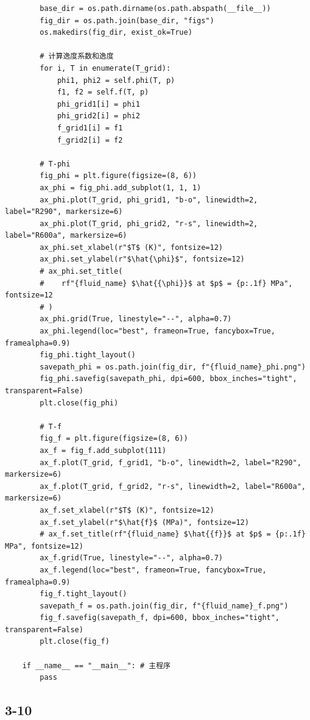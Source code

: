 \documentclass[12pt,a4paper]{article}
\begin{document}
\begin{lstlisting}
        base_dir = os.path.dirname(os.path.abspath(__file__))
        fig_dir = os.path.join(base_dir, "figs")
        os.makedirs(fig_dir, exist_ok=True)

        # 计算逸度系数和逸度
        for i, T in enumerate(T_grid):
            phi1, phi2 = self.phi(T, p)
            f1, f2 = self.f(T, p)
            phi_grid1[i] = phi1
            phi_grid2[i] = phi2
            f_grid1[i] = f1
            f_grid2[i] = f2

        # T-phi
        fig_phi = plt.figure(figsize=(8, 6))
        ax_phi = fig_phi.add_subplot(1, 1, 1)
        ax_phi.plot(T_grid, phi_grid1, "b-o", linewidth=2, label="R290", markersize=6)
        ax_phi.plot(T_grid, phi_grid2, "r-s", linewidth=2, label="R600a", markersize=6)
        ax_phi.set_xlabel(r"$T$ (K)", fontsize=12)
        ax_phi.set_ylabel(r"$\hat{\phi}$", fontsize=12)
        # ax_phi.set_title(
        #    rf"{fluid_name} $\hat{{\phi}}$ at $p$ = {p:.1f} MPa", fontsize=12
        # )
        ax_phi.grid(True, linestyle="--", alpha=0.7)
        ax_phi.legend(loc="best", frameon=True, fancybox=True, framealpha=0.9)
        fig_phi.tight_layout()
        savepath_phi = os.path.join(fig_dir, f"{fluid_name}_phi.png")
        fig_phi.savefig(savepath_phi, dpi=600, bbox_inches="tight", transparent=False)
        plt.close(fig_phi)

        # T-f
        fig_f = plt.figure(figsize=(8, 6))
        ax_f = fig_f.add_subplot(111)
        ax_f.plot(T_grid, f_grid1, "b-o", linewidth=2, label="R290", markersize=6)
        ax_f.plot(T_grid, f_grid2, "r-s", linewidth=2, label="R600a", markersize=6)
        ax_f.set_xlabel(r"$T$ (K)", fontsize=12)
        ax_f.set_ylabel(r"$\hat{f}$ (MPa)", fontsize=12)
        # ax_f.set_title(rf"{fluid_name} $\hat{{f}}$ at $p$ = {p:.1f} MPa", fontsize=12)
        ax_f.grid(True, linestyle="--", alpha=0.7)
        ax_f.legend(loc="best", frameon=True, fancybox=True, framealpha=0.9)
        fig_f.tight_layout()
        savepath_f = os.path.join(fig_dir, f"{fluid_name}_f.png")
        fig_f.savefig(savepath_f, dpi=600, bbox_inches="tight", transparent=False)
        plt.close(fig_f)
    
    if __name__ == "__main__": # 主程序
        pass
\end{lstlisting}

\newpage

\subsection*{3-10}
\end{document}
